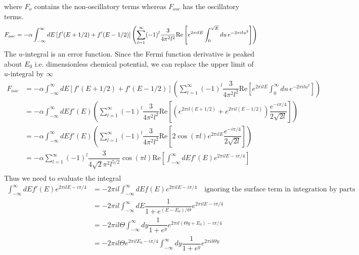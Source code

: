 \documentclass[aps,prb,onecolumn,notitlepage,showpacs,floatfix,superscriptaddress]{revtex4-1}
\begin{document}
where $F_o$ contains the non-oscillatory terms whereas $F_{osc}$ has the oscillatory terms.
\begin{equation}
F_{osc} = - \alpha \int_{-\infty}^\infty dE \left[ f'(E + 1/2) + f'(E-1/2) \right]\left(\sum_{l=1}^\infty  (-1)^l \dfrac{3}{4 \pi^2 l^2}   \text{Re}\left[  e^{2\pi i l E} \int_0^{\sqrt{E}} du \,  e^{-2\pi i l u^2} \right]\right) \\
\end{equation}
The $u$-integral is an error function. Since the Fermi function derivative is peaked about $E_0$ i.e. dimensionless chemical potential, we can replace the upper limit of $u$-integral by $\infty$
\begin{equation}
\begin{split}
F_{osc} &= - \alpha \int_{-\infty}^\infty dE \left[ f'(E + 1/2) + f'(E-1/2) \right]\left(\sum_{l=1}^\infty  (-1)^l \dfrac{3}{4 \pi^2 l^2}   \text{Re}\left[  e^{2\pi i l E} \int_0^{\infty} du \,  e^{-2\pi i l u^2} \right]\right) \\
 &= - \alpha \int_{-\infty}^\infty dE  f'(E )  \left(\sum_{l=1}^\infty  (-1)^l \dfrac{3}{4 \pi^2 l^2}   \text{Re}\left[ ( e^{2\pi i l (E+1/2)} + e^{2\pi i l (E-1/2)}) \dfrac{e^{-i\pi/4}}{2\sqrt{2l}} \right]\right) \\
 &= - \alpha \int_{-\infty}^\infty dE  f'(E )  \left(\sum_{l=1}^\infty  (-1)^l \dfrac{3}{4 \pi^2 l^2}   \text{Re}\left[ 2 \cos(\pi l) e^{2\pi i l E}\dfrac{e^{-i\pi/4}}{2\sqrt{2l}} \right]\right) \\
 &= - \alpha  \sum_{l=1}^\infty  (-1)^l \dfrac{3}{4\sqrt{2} \pi^2 l^{5/2}}   \cos(\pi l) \text{Re}\left[  \int_{-\infty}^\infty dE  f'(E ) e^{2\pi i l E -i\pi/4} \right] \\
\end{split}
\end{equation}
Thus we need to evaluate the integral
\begin{equation}
\begin{split}
\int_{-\infty}^\infty dE  f'(E ) e^{2\pi i l E -i\pi /4} &= -2\pi i l \int_{-\infty}^\infty dE  f(E ) e^{2\pi i l E -i\pi /4} \quad \text{ignoring the surface term in integration by parts} \\
 &= -2\pi i l \int_{-\infty}^\infty dE  \dfrac{1}{1+e^{(E-E_0)/\Theta}} e^{2\pi i l E -i\pi /4} \\
 &= -2\pi i l \Theta \int_{-\infty}^\infty dy  \dfrac{1}{1+e^{y}} e^{2\pi i l (\Theta y + E_0) -i\pi /4} \\
 &= -2\pi i l \Theta e^{2\pi i l  E_0 -i\pi /4} \int_{-\infty}^\infty dy  \dfrac{1}{1+e^{y}} e^{2\pi i l \Theta y } \\
 \end{split}
\end{equation}
\end{document}
